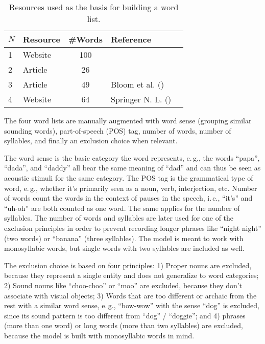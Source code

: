 \documentclass[twocolumn]{article}
\begin{document}
\begin{table}[ht]
    \centering
    \begin{tabular}{llcll}
        $N$ & Resource & \#Words & Reference \\
        \hline
        \hline
        1 & Website & 100 & \textcite{jonjiv_ive_2017} \\
        \hline
        2 & Article & 26 & \textcite{plunkett_learning_2005} \\
        \hline
        3 & Article & 49 & Bloom et al. (\citeyear{bloom_words_1993}) \\
        \hline
        4 & Website & 64 & Springer N. L. (\citeyear{springer_nature_limited_words_nodate}) \\
        \hline
    \end{tabular}
    \caption{Resources used as the basis for building a word list.}
    \label{tab:word-resources}
\end{table}

The four word lists are manually augmented with word sense (grouping similar sounding words), part-of-speech (POS) tag, number of words, number of syllables, and finally an exclusion choice when relevant.

The word sense is the basic category the word represents, e.\,g., the words \enquote{papa}, \enquote{dada}, and \enquote{daddy} all bear the same meaning of \enquote{dad} and can thus be seen as acoustic stimuli for the same category. The POS tag is the grammatical type of word, e.\,g., whether it's primarily seen as a noun, verb, interjection, etc. Number of words count the words in the context of pauses in the speech, i.\,e., \enquote{it's} and \enquote{uh-oh} are both counted as one word. The same applies for the number of syllables. The number of words and syllables are later used for one of the exclusion principles in order to prevent recording longer phrases like \enquote{night night} (two words) or \enquote{banana} (three syllables). The model is meant to work with monosyllabic words, but single words with two syllables are included as well.

The exclusion choice is based on four principles: 1) Proper nouns are excluded, because they represent a single entity and does not generalize to word categories; 2) Sound nouns like \enquote{choo-choo} or \enquote{moo} are excluded, because they don't associate with visual objects; 3) Words that are too different or archaic from the rest with a similar word sense, e.\,g., \enquote{bow-wow} with the sense \enquote{dog} is excluded, since its sound pattern is too different from \enquote{dog} / \enquote{doggie}; and 4) phrases (more than one word) or long words (more than two syllables) are excluded, because the model is built with monosyllabic words in mind.
\end{document}
